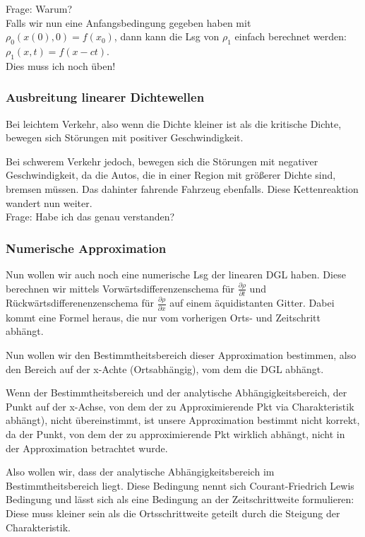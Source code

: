 \documentclass[]{article}
\begin{document}
Frage: Warum? \\

Falls wir nun eine Anfangsbedingung gegeben haben mit $\rho_0(x(0),0)= f(x_0)$, dann kann die Lsg von $\rho_1$ einfach berechnet werden: $\rho_1(x,t)= f(x-ct)$. \\

Dies muss ich noch üben!

\subsubsection*{Ausbreitung linearer Dichtewellen}  
Bei leichtem Verkehr, also wenn die Dichte kleiner ist als die kritische Dichte, bewegen sich Störungen mit positiver Geschwindigkeit.
 
Bei schwerem Verkehr jedoch, bewegen sich die Störungen mit negativer Geschwindigkeit, da die Autos, die in einer Region mit größerer Dichte sind, bremsen müssen. Das dahinter fahrende Fahrzeug ebenfalls. Diese Kettenreaktion wandert nun weiter. \\

Frage: Habe ich das genau verstanden?

\subsubsection*{Numerische Approximation}

Nun wollen wir auch noch eine numerische Lsg der linearen DGL haben. Diese berechnen wir mittels Vorwärtsdifferenzenschema für $\frac{\partial \rho}{\partial t}$ und Rückwärtsdifferenenzenschema für $\frac{\partial \rho}{\partial x}$ auf einem äquidistanten Gitter. Dabei kommt eine Formel heraus, die nur vom vorherigen Orts- und Zeitschritt abhängt. 
 
Nun wollen wir den Bestimmtheitsbereich dieser Approximation bestimmen, also den Bereich auf der x-Achte (Ortsabhängig), vom dem die DGL abhängt.
 
Wenn der Bestimmtheitsbereich und der analytische Abhängigkeitsbereich, der Punkt auf der x-Achse, von dem der zu Approximierende Pkt via Charakteristik abhängt), nicht übereinstimmt, ist unsere Approximation bestimmt nicht korrekt, da der Punkt, von dem der zu approximierende Pkt wirklich abhängt, nicht in der Approximation betrachtet wurde. 
  
Also wollen wir, dass der analytische Abhängigkeitsbereich im Bestimmtheitsbereich liegt. Diese Bedingung nennt sich Courant-Friedrich Lewis Bedingung und lässt sich als eine Bedingung an der Zeitschrittweite formulieren: Diese muss kleiner sein als die Ortsschrittweite geteilt durch die Steigung der Charakteristik. 
  
\end{document}
